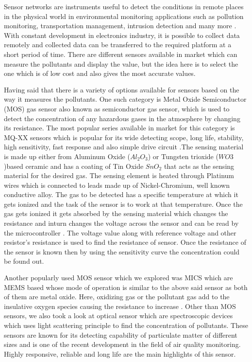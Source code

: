 Sensor networks are instruments useful to detect the conditions in remote places in the physical world in environmental monitoring applications such as pollution monitoring, transportation management, intrusion detection and many more \cite{Jung2011}. With constant development in electronics industry, it is possible to collect data remotely and collected data can be transferred to the required platform at a short period of time.
There are different sensors available in market which can measure the pollutants and display the value, but the idea here is to select the one which is of low cost and also gives the most accurate values.
\par
Having said that there is a variety of options available for sensors based on the way it measures the pollutants. One such category is Metal Oxide Semiconductor (MOS) gas sensor also known as semiconductor gas sensor, which is used to detect the concentration of any hazardous gases in the atmosphere by changing its resistance. The most popular series available in market for this category is MQ-XX sensors which is popular for its wide detecting scope, long life, stability, high sensitivity, fast response and also simple drive circuit \cite{Data2012}.The sensing material is made up either from Aluminum Oxide ($ Al_{2}O_{3}$) or Tungsten trioxide ($WO3$)based ceramic and has a coating of Tin Oxide $ SnO_{2} $ that acts as the sensing material for the desired gas. The sensing element is heated through Platinum wires which is connected to leads made up of Nickel-Chromium, well known conductive alloy. The gas to be detected has a specific temperature at which it gets ionized and the task of the sensor is to work at that temperature. Once the gas gets ionized it gets absorbed by the sensing material which changes the resistance and inturn changes the voltage across the sensor and can be read by the microcontroller \cite{gassensor}. The voltage value along with reference voltage and other resistor's resistance is used to find the resistance of sensor. Once the resistance of the sensor is known then by using the sensitivity curve the concentration could be found out. 

Another popularly used  MOS sensor which we explored was MICS which are MEMS based whose mode of operation is similar to the above said sensor as both of them are metal oxide. Here, oxidizing gas or the pollutant gas add to the insulative oxygen species causing the resistance to increase \cite{SGXSensortech}.
 Other than MOS sensors, we also took a look at optical sensor which are spectroscopic devices which uses light scattering principle to find the concentration of pollutants. These sensors are known for its detecting capability of particulate matter of different sizes and is one of the recent development in the field of air quality monitoring. Highly responsive, reliable and long life are the main highlights of this sensor.
